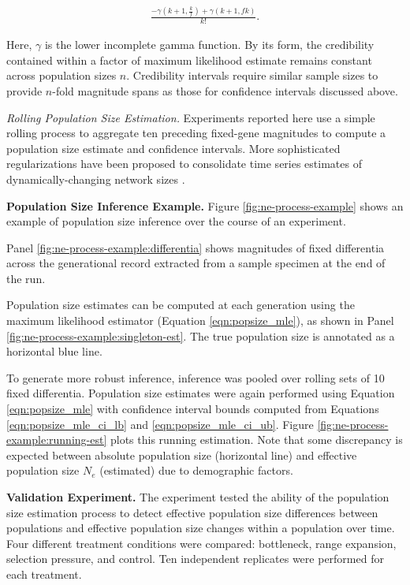 \begin{footnotesize}
\begin{align*}
\frac{- \gamma(k + 1, \frac{k}{f}) + \gamma(k + 1, f k)}{k!}.
\end{align*}
\end{footnotesize}

Here, $\gamma$ is the lower incomplete gamma function.
By its form, the credibility contained within a factor of maximum likelihood estimate remains constant across population sizes $n$.
Credibility intervals require similar sample sizes to provide $n$-fold magnitude spans as those for confidence intervals discussed above.

\textit{Rolling Population Size Estimation.}
Experiments reported here use a simple rolling process to aggregate ten preceding fixed-gene magnitudes to compute a population size estimate and confidence intervals.
More sophisticated regularizations have been proposed to consolidate time series estimates of dynamically-changing network sizes \citep{hakan2012distributed}.


\textbf{Population Size Inference Example.}
Figure \ref{fig:ne-process-example} shows an example of population size inference over the course of an experiment.

Panel \ref{fig:ne-process-example:differentia} shows magnitudes of fixed differentia across the generational record extracted from a sample specimen at the end of the run.

Population size estimates can be computed at each generation using the maximum likelihood estimator (Equation \ref{eqn:popsize_mle}), as shown in Panel \ref{fig:ne-process-example:singleton-est}.
The true population size is annotated as a horizontal blue line.

To generate more robust inference, inference was pooled over rolling sets of 10 fixed differentia.
Population size estimates were again performed using Equation \ref{eqn:popsize_mle} with confidence interval bounds computed from Equations \ref{eqn:popsize_mle_ci_lb} and \ref{eqn:popsize_mle_ci_ub}.
Figure \ref{fig:ne-process-example:running-est} plots this running estimation.
Note that some discrepancy is expected between absolute population size (horizontal line) and effective population size $N_e$ (estimated) due to demographic factors.

\textbf{Validation Experiment.}
The experiment tested the ability of the population size estimation process to detect effective population size differences between populations and effective population size changes within a population over time.
Four different treatment conditions were compared: bottleneck, range expansion, selection pressure, and control.
Ten independent replicates were performed for each treatment.

